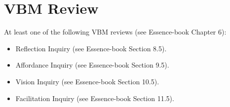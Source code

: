 \section{VBM Review}
At least one of the following VBM reviews (see Essence-book Chapter 6):
\begin{itemize}
\item Reflection Inquiry (see Essence-book Section 8.5).
\item Affordance Inquiry (see Essence-book Section 9.5).
\item Vision Inquiry (see Essence-book Section 10.5).
\item Facilitation Inquiry (see Essence-book Section 11.5).
\end{itemize}